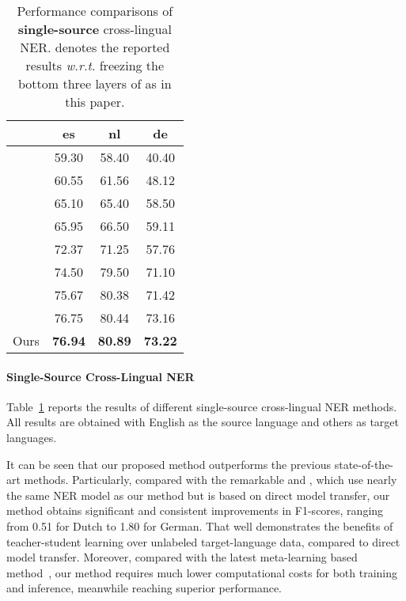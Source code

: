 \documentclass[11pt,a4paper]{article}
\newcommand\wrt{\textit{w.r.t}}
\begin{document}
	\begin{table}[t]
		\centering
		\setlength{\tabcolsep}{1.5mm}
		\begin{tabular}{c|c|c|c}
			\hline
			&	es	&	nl	&	de \\ \hline
			\citet{tackstrom2012cross}& 59.30 & 58.40	& 40.40 \\ \hline
			\citet{tsai2016cross}& 60.55	& 61.56	& 48.12 \\ \hline
			\citet{ni2017weakly}&	65.10 &	65.40 &	58.50 \\ \hline
			\citet{mayhew2017cheap}& 65.95	& 66.50	& 59.11	\\ \hline
			\citet{xie2018neural}& 72.37	& 71.25	& 57.76	\\ \hline
\citet{wu2019beto}&	74.50 &	79.50 &	71.10 \\ \hline
			\citet{moon2019lingua} & 75.67 & 80.38 & 71.42\\ \hline
			\citet{wu2020enhanced}&	76.75 &	80.44 &	73.16 \\ \hline
			\hline
Ours & \textbf{76.94} & \textbf{80.89} & \textbf{73.22} \\ \hline
		\end{tabular}
		\caption{Performance comparisons of \textbf{single-source} cross-lingual NER.  denotes the reported results \wrt. freezing the bottom three layers of  as in this paper.}
\label{tab:single_source}
	\end{table}
	

	\paragraph{Single-Source Cross-Lingual NER}
	Table~\ref{tab:single_source} reports the results of different single-source cross-lingual NER methods. 
	All results are obtained with English as the source language and others as target languages. 
	
	It can be seen that our proposed method outperforms the previous state-of-the-art methods. 
	Particularly, compared with the remarkable \citet{wu2019beto} and \citet{moon2019lingua}, which use nearly the same NER model as our method but is based on direct model transfer, our method obtains significant and consistent improvements in F1-scores, ranging from 0.51 for Dutch to 1.80 for German. That well demonstrates the benefits of teacher-student learning over unlabeled target-language data, compared to direct model transfer. 
	Moreover, compared with the latest meta-learning based method~\cite{wu2020enhanced}, our method requires much lower computational costs for both training and inference, meanwhile reaching superior performance.
	
\end{document}
